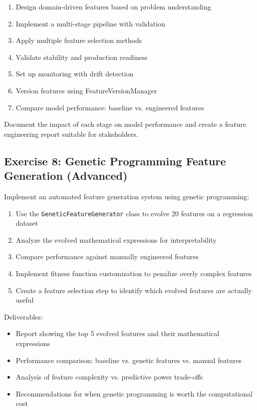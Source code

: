 \begin{enumerate}
    \item Design domain-driven features based on problem understanding
    \item Implement a multi-stage pipeline with validation
    \item Apply multiple feature selection methods
    \item Validate stability and production readiness
    \item Set up monitoring with drift detection
    \item Version features using FeatureVersionManager
    \item Compare model performance: baseline vs. engineered features
\end{enumerate}

Document the impact of each stage on model performance and create a feature engineering report suitable for stakeholders.

\subsection{Exercise 8: Genetic Programming Feature Generation (Advanced)}

Implement an automated feature generation system using genetic programming:

\begin{enumerate}
    \item Use the \texttt{GeneticFeatureGenerator} class to evolve 20 features on a regression dataset
    \item Analyze the evolved mathematical expressions for interpretability
    \item Compare performance against manually engineered features
    \item Implement fitness function customization to penalize overly complex features
    \item Create a feature selection step to identify which evolved features are actually useful
\end{enumerate}

Deliverables:
\begin{itemize}
    \item Report showing the top 5 evolved features and their mathematical expressions
    \item Performance comparison: baseline vs. genetic features vs. manual features
    \item Analysis of feature complexity vs. predictive power trade-offs
    \item Recommendations for when genetic programming is worth the computational cost
\end{itemize}

